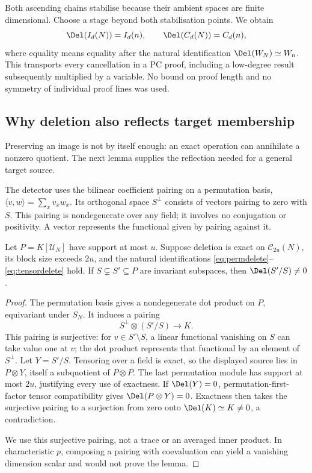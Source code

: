Both ascending chains stabilise because their ambient spaces are finite
dimensional. Choose a stage beyond both stabilisation points. We obtain
\begin{equation}\label{eq:consequence-transport}
 \Del(I_d(N))=I_d(n),\qquad \Del(C_d(N))=C_d(n),
\end{equation}
where equality means equality after the natural identification
$\Del(W_N)\simeq W_n$. This transports every cancellation in a PC
proof, including a low-degree result subsequently multiplied by a
variable. No bound on proof length and no symmetry of individual proof
lines was used.

\subsection{Why deletion also reflects target membership}
Preserving an image is not by itself enough: an exact operation can
annihilate a nonzero quotient. The next lemma supplies the reflection
needed for a general target source.

The detector uses the bilinear coefficient pairing on a permutation
basis, $\langle v,w\rangle=\sum_x v_xw_x$. Its orthogonal space
$S^\perp$ consists of vectors pairing to zero with $S$. This pairing
is nondegenerate over any field; it involves no conjugation or
positivity. A vector represents the functional given by pairing
against it.

\begin{lemma}\label{lem:detect}
Let $P=K[\mathcal U_N]$ have support at most $u$. Suppose deletion is
exact on $\mathcal C_{2u}(N)$, its block size exceeds $2u$, and the
natural identifications \eqref{eq:permdelete}--\eqref{eq:tensordelete}
hold. If $S\subsetneq S'\subseteq P$ are invariant subspaces, then
$\Del(S'/S)\ne0$.
\end{lemma}
\begin{proof}
The permutation basis gives a nondegenerate dot product on $P$,
equivariant under $S_N$. It induces a pairing
\[
                         S^\perp\otimes(S'/S)\longrightarrow K.
\]
This pairing is surjective: for $v\in S'\setminus S$, a linear
functional vanishing on $S$ can take value one at $v$; the dot product
represents that functional by an element of $S^\perp$.
Let $Y=S'/S$. Tensoring over a field is exact, so the displayed
source lies in $P\otimes Y$, itself a subquotient of $P\otimes P$.
The last permutation module has support at most $2u$, justifying
every use of exactness. If $\Del(Y)=0$, permutation-first-factor tensor
compatibility gives $\Del(P\otimes Y)=0$. Exactness then takes the
surjective pairing to a surjection from zero onto
$\Del(K)\simeq K\ne0$, a contradiction.

We use this surjective pairing, not a trace or an averaged inner
product. In characteristic $p$, composing a pairing with coevaluation
can yield a vanishing dimension scalar and would not prove the lemma.
\end{proof}

